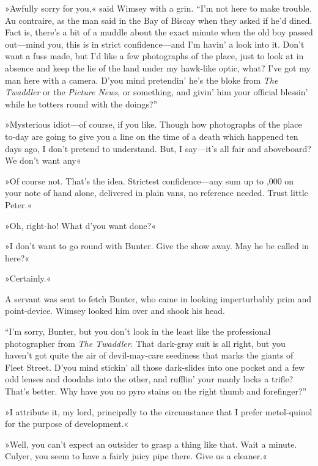 »Awfully sorry for you,« said Wimsey with a grin. \enquote{I'm not here to make trouble. Au contraire, as the man said in the Bay of Biscay when they asked if he'd dined. Fact is, there's a bit of a muddle about the exact minute when the old boy passed out\allowbreak---\allowbreak mind you, this is in strict confidence\allowbreak---\allowbreak and I'm havin' a look into it. Don't want a fuss made, but I'd like a few photographs of the place, just to look at in absence and keep the lie of the land under my hawk-like optic, what? I've got my man here with a camera. D'you mind pretendin' he's the bloke from \textit{The Twaddler} or the \textit{Picture News}, or something, and givin' him your official blessin' while he totters round with the doings?}

»Mysterious idiot\allowbreak---\allowbreak of course, if you like. Though how photographs of the place to-day are going to give you a line on the time of a death which happened ten days ago, I don't pretend to understand. But, I say\allowbreak---\allowbreak it's all fair and aboveboard? We don't want any\longdash«

»Of course not. That's the idea. Strictest confidence\allowbreak---\allowbreak any sum up to ,000 on your note of hand alone, delivered in plain vans, no reference needed. Trust little Peter.«

»Oh, right-ho! What d'you want done?«

»I don't want to go round with Bunter. Give the show away. May he be called in here?«

»Certainly.«

A servant was sent to fetch Bunter, who came in looking imperturbably prim and point-device. Wimsey looked him over and shook his head.

\enquote{I'm sorry, Bunter, but you don't look in the least like the professional photographer from \textit{The Twaddler}. That dark-gray suit is all right, but you haven't got quite the air of devil-may-care seediness that marks the giants of Fleet Street. D'you mind stickin' all those dark-slides into one pocket and a few odd lenses and doodahs into the other, and rufflin' your manly locks a trifle? That's better. Why have you no pyro stains on the right thumb and forefinger?}

»I attribute it, my lord, principally to the circumstance that I prefer metol-quinol for the purpose of development.«

»Well, you can't expect an outsider to grasp a thing like that. Wait a minute. Culyer, you seem to have a fairly juicy pipe there. Give us a cleaner.«

